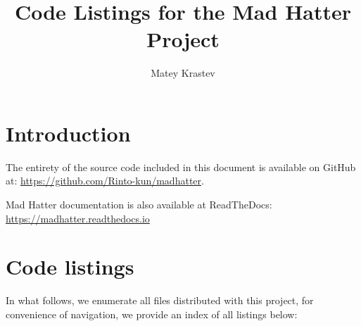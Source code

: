 \documentclass[a4paper]{article}
\title{Code Listings for the Mad Hatter Project}
\author{Matey Krastev}
\begin{document}
\maketitle

\section*{Introduction}

The entirety of the source code included in this document is available on GitHub at: \url{https://github.com/Rinto-kun/madhatter}.

Mad Hatter documentation is also available at ReadTheDocs: \url{https://madhatter.readthedocs.io}

\section*{Code listings}

In what follows, we enumerate all files distributed with this project, for convenience of navigation, we provide an index of all listings below:

\lstlistoflistings










\end{document}

